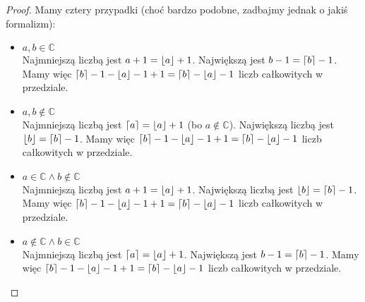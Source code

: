 \documentclass[a4paper]{article}
\DeclarePairedDelimiter\ceil{\lceil}{\rceil}
\DeclarePairedDelimiter\floor{\lfloor}{\rfloor}
\begin{document}
\begin{enumerate}[(a)]
\begin{proof}
Mamy cztery przypadki (choć bardzo podobne, zadbajmy jednak o jakiś formalizm):
\begin{itemize}
\item $a,b \in \mathbb{C}$\\
Najmniejszą liczbą jest $a+1=\floor{a}+1$. Największą jest $b-1=\ceil{b}-1$. Mamy więc $\ceil{b}-1 - \floor{a} - 1 + 1 = \ceil{b}-\floor{a} - 1$ liczb całkowitych w przedziale.

\item $a,b \notin \mathbb{C}$\\
Najmniejszą liczbą jest $\ceil{a}=\floor{a}+1$ (bo $a \notin \mathbb{C}$). Największą liczbą jest $\floor{b}=\ceil{b}-1$. Mamy więc $\ceil{b}-1-\floor{a}-1 + 1 = \ceil{b}-\floor{a}-1$ liczb całkowitych w przedziale.

\item $a \in \mathbb{C} \wedge b \notin \mathbb{C}$\\
Najmniejszą liczbą jest $a+1=\floor{a}+1$. Największą liczbą jest $\floor{b}=\ceil{b}-1$. Mamy więc $\ceil{b}-1 - \floor{a} - 1 + 1 = \ceil{b} - \floor{a} - 1$ liczb całkowitych w przedziale.

\item $a \notin \mathbb{C} \wedge b \in \mathbb{C}$\\
Najmniejszą liczbą jest $\ceil{a}=\floor{a}+1$.  Największą jest $b-1=\ceil{b}-1$. Mamy więc  $\ceil{b}-1 - \floor{a} - 1 + 1 = \ceil{b} - \floor{a} - 1$ liczb całkowitych w przedziale.

\end{itemize}
\end{proof}

\end{enumerate}
\end{document}
